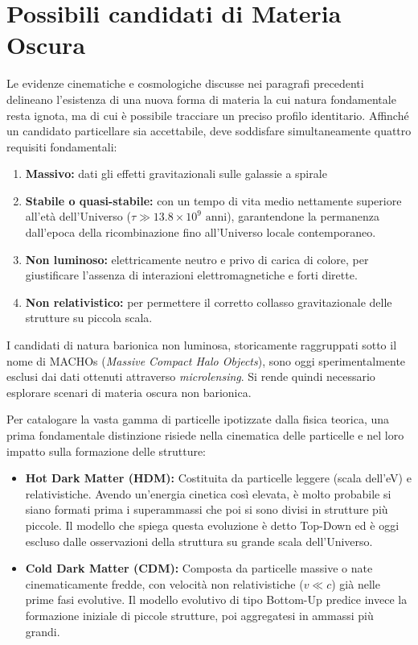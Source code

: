 \section{Possibili candidati di Materia Oscura}
\label{sec:candidati}

Le evidenze cinematiche e cosmologiche discusse nei paragrafi precedenti delineano l'esistenza di una nuova forma di materia la cui natura fondamentale resta ignota, ma di cui è possibile tracciare un preciso profilo identitario. Affinché un candidato particellare sia accettabile, deve soddisfare simultaneamente quattro requisiti fondamentali:
\begin{enumerate}
    \item \textbf{Massivo:} dati gli effetti gravitazionali sulle galassie a spirale
    \item \textbf{Stabile o quasi-stabile:} con un tempo di vita medio nettamente superiore all'età dell'Universo ($\tau \gg 13.8 \times 10^9 \text{ anni}$), garantendone la permanenza dall'epoca della ricombinazione fino all'Universo locale contemporaneo.
    \item \textbf{Non luminoso:} elettricamente neutro e privo di carica di colore, per giustificare l'assenza di interazioni elettromagnetiche e forti dirette.
    \item \textbf{Non relativistico:} per permettere il corretto collasso gravitazionale delle strutture su piccola scala.
\end{enumerate}

I candidati di natura barionica non luminosa, storicamente raggruppati sotto il nome di MACHOs (\textit{Massive Compact Halo Objects}), sono oggi sperimentalmente esclusi dai dati ottenuti attraverso \textit{microlensing}. Si rende quindi necessario esplorare scenari di materia oscura non barionica.

Per catalogare la vasta gamma di particelle ipotizzate dalla fisica teorica, una prima fondamentale distinzione risiede nella cinematica delle particelle e nel loro impatto sulla formazione delle strutture:
\begin{itemize}
    \item \textbf{Hot Dark Matter (HDM):} Costituita da particelle leggere (scala dell'eV) e relativistiche. Avendo un'energia cinetica così elevata, è molto probabile si siano formati prima i superammassi che poi si sono divisi in strutture più piccole. Il modello che spiega questa evoluzione è detto Top-Down ed è oggi escluso dalle osservazioni della struttura su grande scala dell'Universo.
    \item \textbf{Cold Dark Matter (CDM):} Composta da particelle massive o nate cinematicamente fredde, con velocità non relativistiche ($v \ll c$) già nelle prime fasi evolutive. Il modello evolutivo di tipo Bottom-Up predice invece la formazione iniziale di piccole strutture, poi aggregatesi in ammassi più grandi.
\end{itemize}

